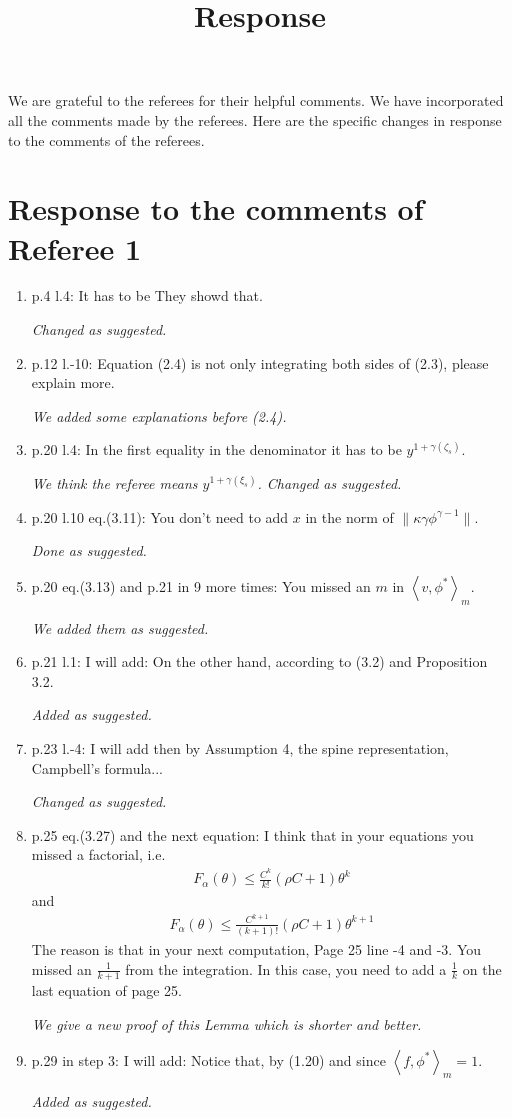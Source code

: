 \documentclass[12pt,a4paper]{amsart}
\numberwithin{equation}{section}
\theoremstyle{plain}
\theoremstyle{definition}
\begin{document}
\title
[Response]
{Response}
\maketitle
We are grateful to the referees for their helpful comments.
We have incorporated all the comments made by the referees.
Here are the specific changes in response to the comments of the referees.
\section*{Response to the comments of Referee 1}
\begin{enumerate}
\item
  p.4 l.4: It has to be They showd that.

  {\it Changed as suggested.}
\item
  p.12 l.-10: Equation (2.4) is not only integrating both sides of (2.3), please explain more.

  {\it We added some explanations before (2.4).}
\item
  p.20 l.4: In the first equality in the denominator it has to be $y^{1+\gamma(\zeta_s)}$.

  {\it We think the referee means $y^{1+\gamma(\xi_s)}$.
    Changed as suggested. }
\item
  p.20 l.10 eq.(3.11): You don't need to add $x$ in the norm of $\|\kappa \gamma \phi^{\gamma - 1}\|$.

  {\it Done as suggested.}
\item
  p.20 eq.(3.13) and p.21 in 9 more times: You missed an $m$ in $\left\langle v, \phi^* \right\rangle_m$.

  {\it We added them as suggested.}
\item
  p.21 l.1: I will add: On the other hand, according to (3.2) and Proposition 3.2.

  {\it Added as suggested.}
\item
  p.23 l.-4: I will add then by Assumption 4, the spine representation, Campbell's formula...

  {\it Changed as suggested.}
\item
  p.25 eq.(3.27) and the next equation: I think that in your equations you missed a factorial, i.e.
  \begin{align}
    F_\alpha(\theta)
    \leq \frac{C^k}{k!} \left( \rho C+1 \right) \theta^k
  \end{align}
  and
  \begin{align}
    F_\alpha(\theta)
    \leq \frac{C^{k+1}}{(k+1)!} \left( \rho  C+1 \right) \theta^{k+1}
  \end{align}
  The reason is that in your next computation, Page 25 line -4 and -3. You missed an $\frac{1}{k+1}$ from the integration.
  In this case, you need to add a $\frac{1}{k}$ on the last equation of page 25.

  {\it We give a new proof of this Lemma which is shorter and better.}
\item
  p.29 in step 3: I will add: Notice that, by (1.20) and since $\left\langle f, \phi^* \right\rangle_m = 1$.

  {\it Added as suggested.}
\end{enumerate}
\end{document}
